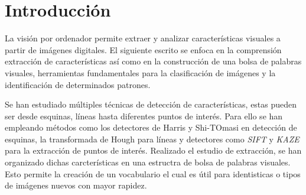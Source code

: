 \documentclass[a4paper,12pt]{article}
\newcommand{\vacio}{\textcolor{white}{ .}}
\begin{document}
{%

\renewcommand{\headrulewidth}{0.5pt}


\pagestyle{fancy}
\renewcommand{\footrulewidth}{0.5pt}
\fancyfoot[C]{\vacio}

\newpage

\renewcommand{\contentsname}{Índice}
\tableofcontents
{}

\newpage


\newpage


\section{Introducción}


\vspace{1cm}

La visión por ordenador permite extraer y analizar características visuales a partir de imágenes digitales. El siguiente escrito se enfoca en la comprensión extracción de 
características así como en la construcción de una bolsa de palabras visuales, herramientas fundamentales para la clasificación de imágenes y la identificación de determinados patrones.

\vspace{0.5cm}

Se han estudiado múltiples técnicas de detección de características, estas pueden ser desde esquinas, líneas hasta diferentes puntos de interés. 
Para ello se han empleando métodos como los detectores de Harris y Shi-TOmasi en detección de esquinas, la transformada de Hough para líneas y detectores como 
\textit{SIFT} y \textit{KAZE} para la extracción de puntos de interés. Realizado el estudio de extracción, se han organizado dichas carcterísticas en una 
estructra de bolsa de palabras visuales. Esto permite la creación de un vocabulario el cual es útil para identisticas o tipos de imágenes nuevos con mayor rapidez.

}
\end{document}

